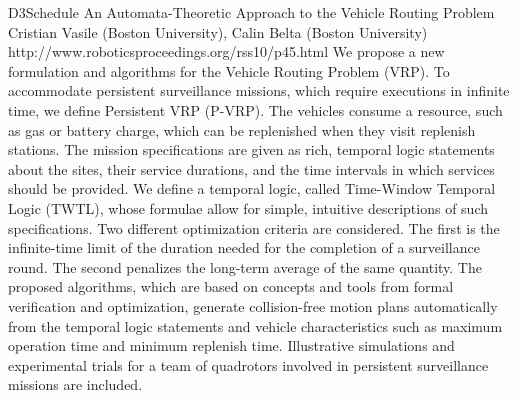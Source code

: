 \begin{spacing}{1.0}
\descriptionPaper
{D3}{Schedule}
{	
An Automata-Theoretic Approach to the Vehicle Routing Problem
}
{
Cristian Vasile (Boston University), Calin Belta (Boston University)
}
{
http://www.roboticsproceedings.org/rss10/p45.html
}
{
We propose a new formulation and algorithms for the Vehicle Routing Problem (VRP). To accommodate persistent surveillance missions, which require executions in infinite time, we define Persistent VRP (P-VRP). The vehicles consume a resource, such as gas or battery charge, which can be replenished when they visit replenish stations. The mission specifications are given as rich, temporal logic statements about the sites, their service durations, and the time intervals in which services should be provided. We define a temporal logic, called Time-Window Temporal Logic (TWTL), whose formulae allow for simple, intuitive descriptions of such specifications. Two different optimization criteria are considered. The first is the infinite-time limit of the duration needed for the completion of a surveillance round. The second penalizes the long-term average of the same quantity. The proposed algorithms, which are based on concepts and tools from formal verification and optimization, generate collision-free motion plans automatically from the temporal logic statements and vehicle characteristics such as maximum operation time and minimum replenish time. Illustrative simulations and experimental trials for a team of quadrotors involved in persistent surveillance missions are included.
}



\end{spacing}
